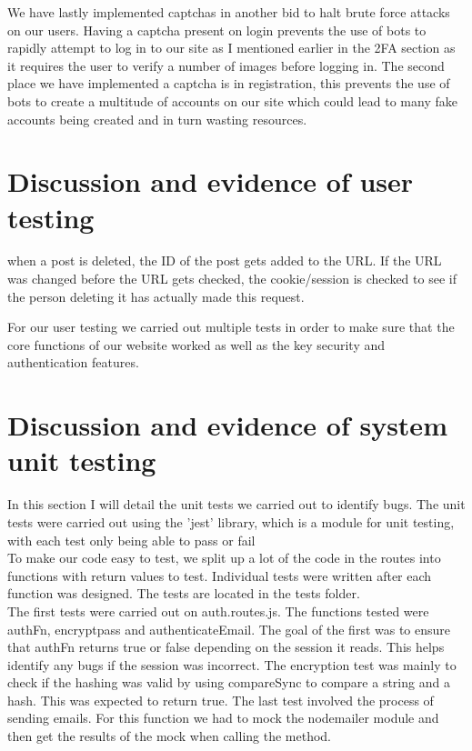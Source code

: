 \documentclass{ueacmpstyle}
\begin{document}
	We have lastly implemented captchas in another bid to halt brute force attacks on our users. Having a captcha present on login prevents the use of bots to rapidly attempt to log in to our site as I mentioned earlier in the 2FA section as it requires the user to verify a number of images before logging in. The second place we have implemented a captcha is in registration, this prevents the use of bots to create a multitude of accounts on our site which could lead to many fake accounts being created and in turn wasting resources.
	
	\section{Discussion and evidence of user testing}
	
	when a post is deleted, the ID of the post gets added to the URL. If the URL was changed before the URL gets checked, the cookie/session is checked to see if the person deleting it has actually made this request.
	
	For our user testing we carried out multiple tests in order to make sure that the core functions of our website worked as well as the key security and authentication features.
	
	
	
	\section{Discussion and evidence of system unit testing}
	
	In this section I will detail the unit tests we carried out to identify bugs.
	The unit tests were carried out using the 'jest' library, which is a module for unit testing, with each test only being able to pass or fail\\
	
	To make our code easy to test, we split up a lot of the code in the routes into functions with return values to test.
	Individual tests were written after each function was designed. The tests are located in the tests folder.\\
	
	The first tests were carried out on auth.routes.js. The functions tested were authFn, encryptpass and authenticateEmail. The goal of the first was to ensure that authFn returns true or false depending on the session it reads. This helps identify any bugs if the session was incorrect.
	The encryption test was mainly to check if the hashing was valid by using compareSync to compare a string and a hash. This was expected to return true. The last test involved the process of sending emails. For this function we had to mock the nodemailer module and then get the results of the mock when calling the method.\\
	
\end{document}
